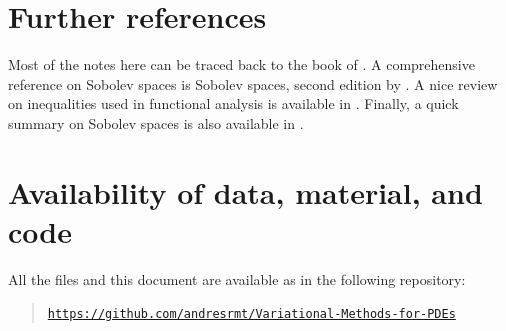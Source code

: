 \documentclass[a4paper,doc,11pt]{article}
\begin{document}
\section*{Further references}

Most of the notes here can be traced back to the book of \citet{Brezis2010}. A comprehensive reference on Sobolev spaces is Sobolev spaces, second edition by \citet{Adams2003}. A nice review on inequalities used in functional analysis is available in \citet{Evans}. Finally, a quick summary on Sobolev spaces is also available in \citet{Ball2019}.







\section*{Availability of data, material, and code}
{

All the files and this document are available as in the following repository:
\begin{quote}
    \noindent \href{https://github.com/andresrmt/Variational-Methods-for-PDEs}{\texttt{https://github.com/andresrmt/Variational-Methods-for-PDEs}}
\end{quote}



}




\end{document}

